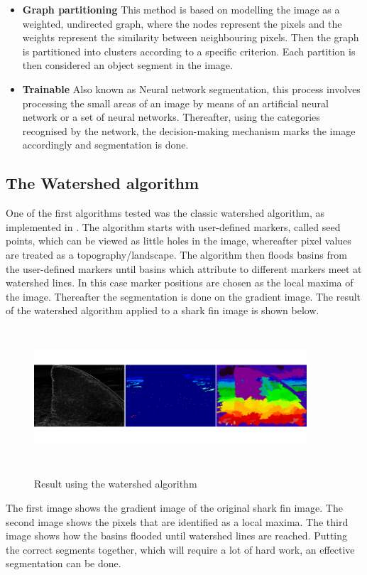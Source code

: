 \documentclass[a4paper,10pt]{article}
\begin{document}
\begin{itemize}
 \item \textbf{Graph partitioning} \cite{is} This method is based on modelling
the image as a weighted, undirected graph, where the nodes represent the pixels
and the weights represent the similarity between neighbouring pixels. Then the
graph is partitioned into clusters according to a specific criterion.  Each
partition is then considered an object segment in the image.       
 \item \textbf{Trainable} \cite{is} Also known as Neural network segmentation,
this process involves processing the small areas of an image by means of an
artificial neural network or a set of neural networks.  Thereafter, using the
categories recognised by the network, the decision-making mechanism marks the
image accordingly and segmentation is done.
\end{itemize}

\subsection{The Watershed algorithm}
One of the first algorithms tested was the classic watershed algorithm, as
implemented in \cite{scikit}.  The algorithm starts with user-defined markers,
called seed points, which can be viewed as little holes in the image, whereafter
pixel values are treated as a topography/landscape.  The algorithm then floods
basins from the user-defined markers until basins which attribute to different
markers meet at watershed lines.  In this case marker positions are chosen as
the local maxima of the image.  Thereafter the segmentation is done on the
gradient image.  The result of the watershed algorithm applied to a shark fin
image is shown below.

\begin{figure}[H]
\centering
\includegraphics[width=4in,height=2in]{watershed.png} 
\label{fig1}
\caption{Result using the watershed algorithm}
\end{figure}

\noindent The first image shows the gradient image of the original shark fin
image.  The second image shows the pixels that are identified as a local maxima.
 The third image shows how the basins flooded until watershed lines are reached.
 Putting the correct segments together, which will require a lot of hard work,
an effective segmentation can be done.
\end{document}
